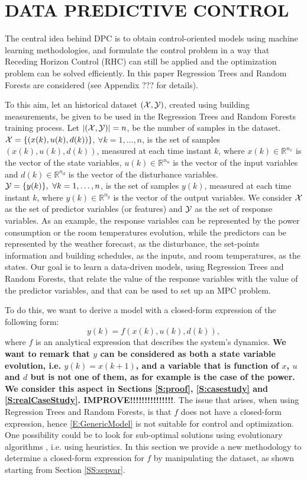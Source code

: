 \section{DATA PREDICTIVE CONTROL}
\label{S:dpc}

\textcolor[rgb]{0,0,1}{The central idea behind DPC is to obtain control-oriented models using machine learning methodologies, and formulate the control problem in a way that Receding Horizon Control (RHC) can still be applied and the optimization problem can be solved efficiently. In this paper Regression Trees and Random Forests are considered (see Appendix ??? for details).}

\textcolor[rgb]{0,0,1}{To this aim, let an historical dataset $(\mathcal{X},\mathcal{Y})$, created using building measurements, be given to be used in the Regression Trees and Random Forests training process.
Let $|(\mathcal{X},\mathcal{Y})| = n$, be the number of samples in the dataset.
$\mathcal{X} = \{(x(k),u(k),d(k))\}$, $\forall k = 1,\ldots,n$, is the set of samples $(x(k),u(k),d(k))$, measured at each time instant $k$, where $x(k)\in\mathbb{R}^{n_x}$ is the vector of the state variables, $u(k)\in\mathbb{R}^{n_u}$ is the vector of the input variables and $d(k)\in\mathbb{R}^{n_d}$ is the vector of the disturbance variables.
$\mathcal{Y} = \{y(k)\},\ \forall k = 1,\ldots,n$, is the set of samples $y(k)$, measured at each time instant $k$, where $y(k)\in\mathbb{R}^{n_y}$ is the vector of the output variables.
We consider $\mathcal{X}$ as the set of predictor variables (or features) and $\mathcal{Y}$ as the set of response variables.
As an example, the response variables can be represented by the power consumption or the room temperatures evolution, while the predictors can be represented by the weather forecast, as the disturbance, the set-points information and building schedules, as the inputs, and room temperatures, as the states. 
Our goal is to learn a data-driven models, using Regression Trees and Random Forests, that relate the value of the response variables with the value of the predictor variables, and that can be used to set up an MPC problem.
}

\textcolor[rgb]{0,0,1}{To do this, we want to derive a model with a closed-form expression of the following form:
\begin{equation}\label{E:GenericModel}
	y(k)=f(x(k),u(k),d(k)),
\end{equation}
where $f$ is an analytical expression that describes the system's dynamics.
\textbf{We want to remark that $y$ can be considered as both a state variable evolution, i.e. $y(k) = x(k+1)$, and a variable that is function of $x$, $u$ and $d$ but is not one of them, as for example is the case of the power. We consider this aspect in Sections \ref{S:proof}, \ref{S:casestudy} and \ref{S:realCaseStudy}. IMPROVE!!!!!!!!!!!!!!!}.
The issue that arises, when using Regression Trees and Random Forests, is that $f$ does not have a closed-form expression, hence \eqref{E:GenericModel} is not suitable for control and optimization.
One possibility could be to look for sub-optimal solutions using evolutionary algorithms \cite{Kusiak2009}, i.e. using heuristics.
In this section we provide a new methodology to determine a closed-form expression for $f$ by manipulating the dataset, as shown starting from Section \ref{SS:sepvar}.}


